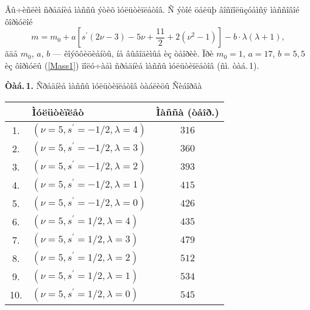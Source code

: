 Âû÷èñëèì ñðåäíèå ìàññû ýòèõ ìóëüòèïëåòîâ. Ñ ýòîé öåëüþ âîñïîëüçóåìñÿ ìàññîâîé ôîðìóëîé \cite{Fet}
\begin{equation}\label{Mass1}
m=m_0+a\left[s^\prime(2\nu-3)-5\nu+\frac{11}{2}+2(\nu^2-1)\right]-b\cdot\lambda(\lambda+1),
\end{equation}
ãäå $m_0$, $a$, $b$ --- êîýôôèöèåíòû, íå âûâîäèìûå èç òåîðèè. Ïðè $m_0=1$, $a=17$, $b=5{,}5$ èç ôîðìóëû (\ref{Mass1}) ïîëó÷àåì ñðåäíèå ìàññû ìóëüòèïëåòîâ (ñì. òàá.\,1).
\begin{center}
{\textbf{Òàá.\,1.} Ñðåäíèå ìàññû ìóëüòèïëåòîâ òàáëèöû Ñèáîðãà}
\vspace{0.1cm}
{\renewcommand{\arraystretch}{1.0}
\begin{tabular}{|c||l|c|}\hline
 & Ìóëüòèïëåò & Ìàññà (òåîð.) \\ \hline\hline
1. & $(\nu=5,s^\prime=-1/2,\lambda=4)$ & $316$ \\
2. & $(\nu=5,s^\prime=-1/2,\lambda=3)$ & $360$ \\
3. & $(\nu=5,s^\prime=-1/2,\lambda=2)$ & $393$ \\
4. & $(\nu=5,s^\prime=-1/2,\lambda=1)$ & $415$ \\
5. & $(\nu=5,s^\prime=-1/2,\lambda=0)$ & $426$ \\
6. & $(\nu=5,s^\prime=1/2,\lambda=4)$ & $435$ \\
7. & $(\nu=5,s^\prime=1/2,\lambda=3)$ & $479$ \\
8. & $(\nu=5,s^\prime=1/2,\lambda=2)$ & $512$ \\
9. & $(\nu=5,s^\prime=1/2,\lambda=1)$ & $534$ \\
10. & $(\nu=5,s^\prime=1/2,\lambda=0)$& $545$ \\
\hline
\end{tabular}
}
\end{center}

